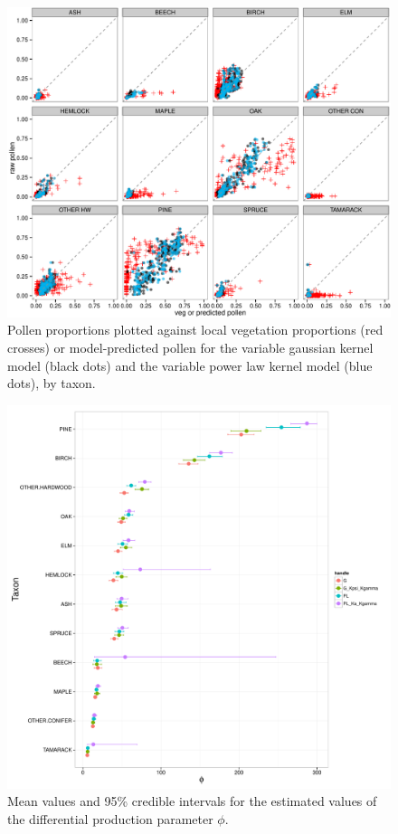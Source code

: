 \begin{figure}
\centering
\includegraphics[width=7in]{figures/pollen_preds_flexible.pdf}
\caption{Pollen proportions plotted against local vegetation proportions (red crosses) or model-predicted pollen for the variable gaussian kernel model (black dots) and the variable power law kernel model (blue dots), by taxon.}
\label{fig:preds}
\end{figure}

\begin{figure}
\centering
\includegraphics[width=7in]{figures/phi.pdf}
\caption{Mean values and 95\% credible intervals for the estimated values of the differential production parameter $\phi$.}
\label{fig:phi}
\end{figure}

